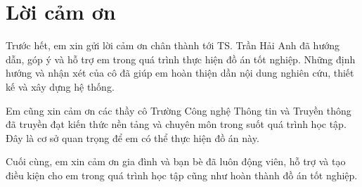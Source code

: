 \documentclass[../DoAn.tex]{subfiles}
\begin{document}
\chapter*{Lời cảm ơn}

Trước hết, em xin gửi lời cảm ơn chân thành tới TS. Trần Hải Anh đã hướng dẫn, góp ý và hỗ trợ em trong quá trình thực hiện đồ án tốt nghiệp. Những định hướng và nhận xét của cô đã giúp em hoàn thiện dần nội dung nghiên cứu, thiết kế và xây dựng hệ thống.

Em cũng xin cảm ơn các thầy cô Trường Công nghệ Thông tin và Truyền thông đã truyền đạt kiến thức nền tảng và chuyên môn trong suốt quá trình học tập. Đây là cơ sở quan trọng để em có thể thực hiện đồ án này.

Cuối cùng, em xin cảm ơn gia đình và bạn bè đã luôn động viên, hỗ trợ và tạo điều kiện cho em trong quá trình học tập cũng như hoàn thành đồ án tốt nghiệp.
\end{document}

